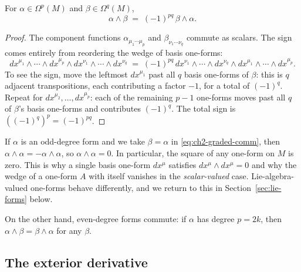 \begin{proposition}\label{prop:graded-comm}
For $\alpha \in \Omega^p(M)$ and $\beta \in \Omega^q(M)$,
\begin{equation}\label{eq:ch2-graded-comm}
\alpha \wedge \beta \;=\; (-1)^{pq}\,\beta \wedge \alpha.
\end{equation}
\end{proposition}

\begin{proof}
The component functions $\alpha_{\mu_1\cdots\mu_p}$ and $\beta_{\nu_1\cdots\nu_q}$ commute as scalars. The sign comes entirely from reordering the wedge of basis one-forms:
\begin{equation*}
dx^{\mu_1}\wedge\cdots\wedge dx^{\mu_p}\wedge dx^{\nu_1}\wedge\cdots\wedge dx^{\nu_q} \;=\; (-1)^{pq}\,dx^{\nu_1}\wedge\cdots\wedge dx^{\nu_q}\wedge dx^{\mu_1}\wedge\cdots\wedge dx^{\mu_p}.
\end{equation*}
To see the sign, move the leftmost $dx^{\mu_1}$ past all $q$ basis one-forms of $\beta$: this is $q$ adjacent transpositions, each contributing a factor $-1$, for a total of $(-1)^q$. Repeat for $dx^{\mu_2}, \dots, dx^{\mu_p}$: each of the remaining $p-1$ one-forms moves past all $q$ of $\beta$'s basis one-forms and contributes $(-1)^q$. The total sign is $\left((-1)^q\right)^p = (-1)^{pq}$.
\end{proof}

\begin{remark}\label{rem:wedge-specials}
If $\alpha$ is an odd-degree form and we take $\beta = \alpha$ in \eqref{eq:ch2-graded-comm}, then $\alpha \wedge \alpha = -\alpha \wedge \alpha$, so $\alpha \wedge \alpha = 0$. In particular, the square of any one-form on $M$ is zero. This is why a single basis one-form $dx^\mu$ satisfies $dx^\mu \wedge dx^\mu = 0$ and why the wedge of a one-form $A$ with itself vanishes in the \emph{scalar-valued} case. Lie-algebra-valued one-forms behave differently, and we return to this in Section~\ref{sec:lie-forms} below.

On the other hand, even-degree forms commute: if $\alpha$ has degree $p = 2k$, then $\alpha \wedge \beta = \beta \wedge \alpha$ for any $\beta$.
\end{remark}

\subsection{The exterior derivative}

